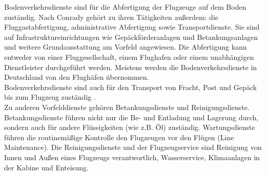 Bodenverkehrsdienste sind für die Abfertigung der Flugzeuge auf dem Boden zuständig.
Nach Conrady \cite{conrady2019luftverkehr} gehört zu ihren Tätigkeiten außerdem:  
die Fluggastabfertigung, administrative Abfertigung sowie Transportdienste.
Sie sind auf Infrastruktureinrichtungen wie Gepäckförderanlagen und Betankungsanlagen und weitere Grundausstattung am Vorfeld angewiesen. 
Die Abfertigung kann entweder von einer Fluggesellschaft, einem Flughafen oder einem unabhängigen Dienstleister durchgeführt werden. 
Meistens werden die Bodenverkehrsdienste in Deutschland von den Flughäfen übernommen.\\ %
%
Bodenverkehrsdienste sind auch für den Transport von Fracht, Post und Gepäck bis zum Flugzeug zuständig \cite{mensen2013handbuch}.\\
Zu anderen Vorfelddienste gehören Betankungsdienste und Reinigungsdienste.
Betankungsdienste führen nicht nur die Be- und Entladung und Lagerung durch, sondern auch für andere Flüssigkeiten (wie z.B. Öl) zuständig.
Wartungsdienste führen die routinemäßige Kontrolle den Flugzeugen vor den Flügen (Line Maintenance).
Die Reinigungsdienste und der Flugzeugservice sind Reinigung von Innen und Außen eines Flugzeugs verantwortlich, Wasserservice, 
Klimaanlagen in der Kabine und Enteisung.
%
%

